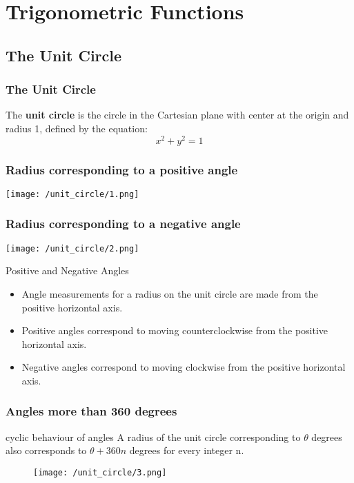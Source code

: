 \section{Trigonometric Functions}

\subsection{The Unit Circle}
\begin{frame}
    \frametitle{The Unit Circle}
    \begin{definition}
        The \textbf{unit circle} is the circle in the Cartesian plane with center at the origin and radius 1, defined by the equation:
        \[
        x^2 + y^2 = 1
        \]
    \end{definition}                                                                                                                                    
\end{frame}

\begin{frame}
    \frametitle{Radius corresponding to a positive angle}
    \centering
    \texttt{[image: /unit\_circle/1.png]}
\end{frame}

\begin{frame}
    \frametitle{Radius corresponding to a negative angle}
    \centering
    \texttt{[image: /unit\_circle/2.png]}
\end{frame}

\begin{frame}
    \begin{block}{Positive and Negative Angles}
        \begin{itemize}
            \item Angle measurements for a radius on the unit circle are made from the positive horizontal axis.
            \item Positive angles correspond to moving counterclockwise from the positive horizontal axis.
            \item Negative angles correspond to moving clockwise from the positive horizontal axis.
        \end{itemize}
    \end{block}
\end{frame}

\begin{frame}
    \frametitle{Angles more than 360 degrees}
    \begin{block}{cyclic behaviour of angles}
        A radius of the unit circle corresponding to $\theta$ degrees also corresponds to $\theta + 360n$ degrees for every integer n.
    \end{block}
    \begin{figure}[h]    
        \centering
        \texttt{[image: /unit\_circle/3.png]}
    \end{figure}
\end{frame}

